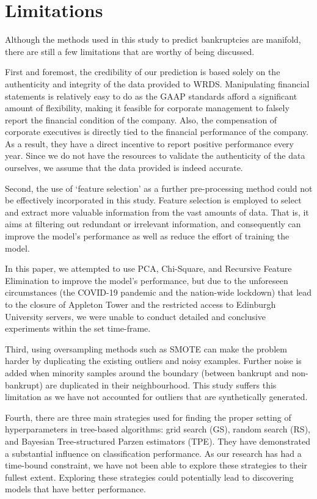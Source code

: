 \section{Limitations}
Although the methods used in this study to predict bankruptcies are manifold, there are still a few limitations that are worthy of being discussed.

First and foremost, the credibility of our prediction is based solely on the authenticity and integrity of the data provided to WRDS. 
Manipulating financial statements is relatively easy to do \cite{agyenim2017role}  as the GAAP standards afford a significant amount of flexibility, making it feasible for corporate management to falsely report the financial condition of the company. Also, the compensation of corporate executives is directly tied to the financial performance of the company. As a result, they have a direct incentive to report positive performance every year. Since we do not have the resources to validate the authenticity of the data ourselves, we assume that the data provided is indeed accurate.

Second, the use of `feature selection' as a further pre-processing method could not be effectively incorporated in this study. Feature selection is employed to select and extract more valuable information from the vast amounts of data. That is, it aims at filtering out redundant or irrelevant information, and consequently can improve the model’s performance as well as reduce the effort of training the model. 

In this paper, we attempted to use PCA, Chi-Square, and Recursive Feature Elimination to improve the model's performance, but due to the unforeseen circumstances (the COVID-19 pandemic and the nation-wide lockdown) that lead to the closure of Appleton Tower and the restricted access to Edinburgh University servers, we were unable to conduct detailed and conclusive experiments within the set time-frame.

Third, using oversampling methods such as SMOTE can make the problem harder by duplicating the existing outliers and noisy examples. Further noise is added when minority samples around the boundary (between bankrupt and non-bankrupt) are duplicated in their neighbourhood. This study suffers this limitation as we have not accounted for outliers that are synthetically generated.

Fourth, there are three main strategies used for finding the proper setting of hyperparameters in tree-based algorithms: grid search (GS), random search (RS), and Bayesian Tree-structured Parzen estimators (TPE). They have demonstrated a substantial influence on classification performance.
As our research has had a time-bound constraint, we have not been able to explore these strategies to their fullest extent. Exploring these strategies could potentially lead to discovering models that have better performance.

